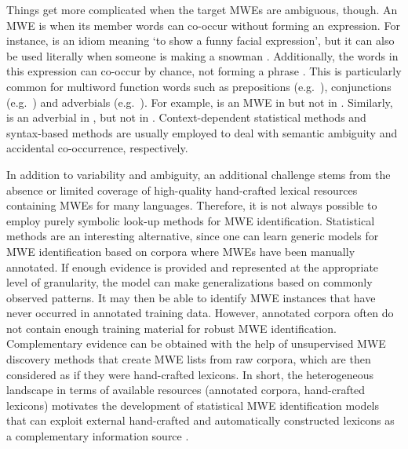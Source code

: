 \documentclass[output=paper,
modfonts
]{langscibook}
\begin{document}
Things get more complicated when the target MWEs are ambiguous, though. An MWE is  when its member words can co-occur without forming an expression. 
For instance,  is an idiom meaning `to show a funny facial expression', but it can also be used literally when someone is making a snowman \citep{fazly-cook-stevenson:2009:CL}. 
Additionally, the words in this expression can co-occur by chance, not forming a phrase \citep{BoukobzaR09,shigeto-EtAl:2013:MWE}. This is particularly common for multiword function words such as prepositions (e.g.\ ), conjunctions (e.g.\ ) and adverbials (e.g.\ ). 
For example,  is an MWE in  but not in . 
Similarly,  is an adverbial in , but not in .
Context-dependent statistical methods \citep{fazly-cook-stevenson:2009:CL,BoukobzaR09} and syntax-based methods \citep{candito-constant:acl:2014,nasr:acl:2015} are usually employed to deal with semantic ambiguity and accidental co-occurrence, respectively.

In addition to variability and ambiguity, an additional challenge stems from the absence or limited coverage of high-quality hand-crafted lexical resources containing MWEs for many languages.
Therefore, it is not always possible to employ purely symbolic look-up methods for MWE identification.
Statistical methods are an interesting alternative, since one can learn generic models for MWE identification based on corpora where MWEs have been manually annotated.
If enough evidence is provided and represented at the appropriate level of granularity, the model can make generalizations based on commonly observed patterns. It may then be able to identify MWE instances that have never occurred in annotated training data.
However, annotated corpora often do not contain enough training material for robust MWE identification. 
Complementary evidence can be obtained with the help of unsupervised MWE discovery methods that create MWE lists from raw corpora, which are then considered as if they were hand-crafted lexicons.
In short, the heterogeneous landscape in terms of available resources (annotated corpora, hand-crafted lexicons) motivates the development of statistical MWE identification models that can exploit external hand-crafted and automatically constructed lexicons as a complementary information source \citep{constant-sigogne:2011:MWE,Schneider14b,riedl-biemann:2016:MWE}.
\end{document}
